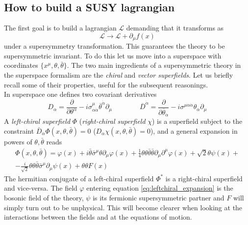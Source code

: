 \documentclass[12pt]{article}
\begin{document}
\subsection{How to build a SUSY lagrangian}
The first goal is to build a lagrangian $\mathcal{L}$ demanding that it transforms as
\begin{equation*}
  \mathcal{L} \to \mathcal{L} + \partial_\mu f(x)
\end{equation*}
under a supersymmetry transformation. This guarantees the theory to be supersymmetric invariant.
To do this let us move into a superspace with coordinates $\{x^\mu, \theta, \bar\theta\}$. The two main ingredients of a supersymmetric theory in the superspace formalism are the \emph{chiral} and \emph{vector superfields}. Let us briefly recall some of their properties, useful for the subsequent reasonings. \\
In superspace one defines two covariant derivatives
\begin{equation*}
  D_{\alpha} = \frac{\partial}{\partial \theta^\alpha} - i \sigma^\mu_{\alpha \dot\alpha} \overline{\theta}^{\dot\alpha} \partial_\mu \qquad\qquad \overline{D}^{\dot\alpha} = \frac{\partial}{\partial \overline{\theta}_{\dot\alpha}} - i \sigma^{\mu \alpha \dot\alpha}\theta_\alpha \partial_\mu
\end{equation*}
A \emph{left-chiral superfield} $\Phi$ (\emph{right-chiral superfield} $\chi$) is a superfield subject to the constraint $\bar D_{\dot \alpha} \Phi(x, \theta, \bar\theta) = 0$  ($D_{\alpha} \chi(x, \theta, \bar\theta) = 0$), and a general expansion in powers of $\theta, \bar\theta$ reads
\begin{equation}
\begin{gathered}
  \Phi(x, \theta, \bar\theta) = \varphi(x) + i\bar\theta \bar\sigma^{\mu}\theta \partial_{\mu}\varphi(x) + \frac{1}{4}\theta\theta\bar\theta\bar\theta\partial_{\mu}\partial^{\mu}\varphi(x) + \sqrt{2}\theta\psi(x) + \\ 
                -\frac{i}{\sqrt{2}}\theta\theta\bar\theta\bar\sigma^{\mu}\partial_{\mu}\psi(x) + \theta\theta F(x)
\end{gathered}
\label{eq:leftchiral_expansion}
\end{equation}
The hermitian conjugate of a left-chiral superfield $\Phi^*$ is a right-chiral superfield and vice-versa.
The field $\varphi$ entering equation \ref{eq:leftchiral_expansion} is the bosonic field of the theory, $\psi$ is its fermionic supersymmetric partner and $F$ will simply turn out to be unphysical. This will become clearer when looking at the interactions between the fields and at the equations of motion. \\
\end{document}
